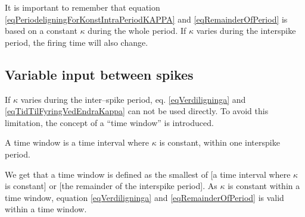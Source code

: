 It is important to remember that equation \eqref{eqPeriodeligningForKonstIntraPeriodKAPPA} and \eqref{eqRemainderOfPeriod} is based on a constant $\kappa$ during the whole period. 
If $\kappa$ varies during the interspike period, the firing time will also change. 




\subsection{Variable input between spikes}
\label{ssecVariableInputBetweenSpikes}


If $\kappa$ varies during the inter--spike period, eq. \eqref{eqVerdiligninga} and \eqref{eqTidTilFyringVedEndraKappa} can not be used directly.
To avoid this limitation, the concept of a ``time window'' is introduced. 
\begin{mydef}
A time window is a time interval where $\kappa$ is constant, within one interspike period.
\end{mydef}
%
We get that a time window is defined as the smallest of [a time interval where $\kappa$ is constant] or [the remainder of the interspike period].
As $\kappa$ is constant within a time window, equation \eqref{eqVerdiligninga} and \eqref{eqRemainderOfPeriod} is valid within a time window.

